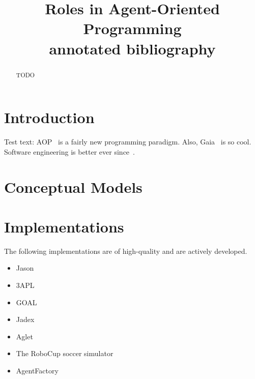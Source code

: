 \documentclass{article}
\title{Roles in Agent-Oriented Programming\\[1ex]\small{annotated bibliography}}
\begin{document}
\maketitle

\begin{abstract}
TODO
\end{abstract}

\section{Introduction}

Test text:
AOP~\cite{journals/ai/Shoham93} is a fairly new programming paradigm.
Also, Gaia~\cite{journals/aamas/WooldridgeJK00} is so cool.
Software engineering is better ever since~\cite{conf/aose/WooldridgeC00}.

\section{Conceptual Models}

\section{Implementations}

The following implementations are of high-quality and are actively developed.
\begin{itemize}
\item Jason~\cite{books/sp/map2005/BordiniHV05}
\item 3APL~\cite{books/sp/map2005/DastaniRM05}
\item GOAL~\cite{hindriks2009programmingrationalagents}
\item Jadex~\cite{todo}
\item Aglet~\cite{todo}
\item The RoboCup soccer simulator
\item AgentFactory
\end{itemize}



\end{document}
